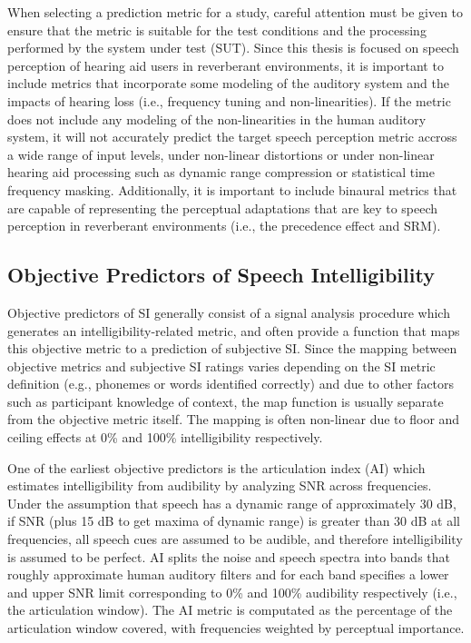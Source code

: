When selecting a prediction metric for a study, careful attention must be given to ensure that the metric is suitable for the test conditions and the processing performed by the system under test (SUT). Since this thesis is focused on speech perception of hearing aid users in reverberant environments, it is important to include metrics that incorporate some modeling of the auditory system and the impacts of hearing loss (i.e., frequency tuning and non-linearities). If the metric does not include any modeling of the non-linearities in the human auditory system, it will not accurately predict the target speech perception metric accross a wide range of input levels, under non-linear distortions or under non-linear hearing aid processing such as dynamic range compression or statistical time frequency masking. Additionally, it is important to include binaural metrics that are capable of representing the perceptual adaptations that are key to speech perception in reverberant environments (i.e., the precedence effect and SRM).

\subsection{Objective Predictors of Speech Intelligibility} \label{section_si_metrics}

Objective predictors of SI generally consist of a signal analysis procedure which generates an intelligibility-related metric, and often provide a function that maps this objective metric to a prediction of subjective SI. Since the mapping between objective metrics and subjective SI ratings varies depending on the SI metric definition (e.g., phonemes or words identified correctly) and due to other factors such as participant knowledge of context, the map function is usually separate from the objective metric itself. The mapping is often non-linear due to floor and ceiling effects at 0\% and 100\% intelligibility respectively.

One of the earliest objective predictors is the articulation index (AI) \citep{kryter1962methods} which estimates intelligibility from audibility by analyzing SNR across frequencies. Under the assumption that speech has a dynamic range of approximately 30 dB, if SNR (plus 15 dB to get maxima of dynamic range) is greater than 30 dB at all frequencies, all speech cues are assumed to be audible, and therefore intelligibility is assumed to be perfect. AI splits the noise and speech spectra into bands that roughly approximate human auditory filters and for each band specifies a lower and upper SNR limit corresponding to 0\% and 100\% audibility respectively (i.e., the articulation window). The AI metric is computated as the percentage of the articulation window covered, with frequencies weighted by perceptual importance.

